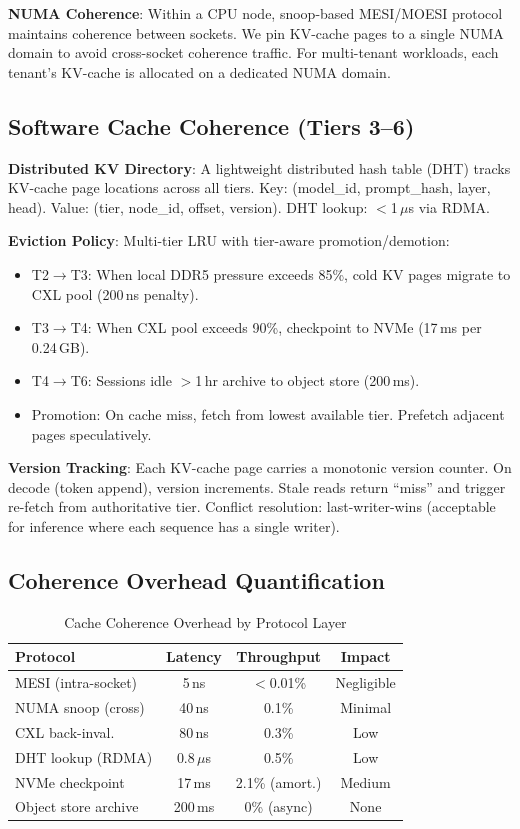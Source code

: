 \documentclass[conference,10pt]{IEEEtran}
\begin{document}
\textbf{NUMA Coherence}: Within a CPU node, snoop-based MESI/MOESI protocol maintains coherence between sockets. We pin KV-cache pages to a single NUMA domain to avoid cross-socket coherence traffic. For multi-tenant workloads, each tenant's KV-cache is allocated on a dedicated NUMA domain.

\subsection{Software Cache Coherence (Tiers 3--6)}

\textbf{Distributed KV Directory}: A lightweight distributed hash table (DHT) tracks KV-cache page locations across all tiers. Key: (model\_id, prompt\_hash, layer, head). Value: (tier, node\_id, offset, version). DHT lookup: $<$1\,$\mu$s via RDMA.

\textbf{Eviction Policy}: Multi-tier LRU with tier-aware promotion/demotion:
\begin{itemize}
\item T2$\to$T3: When local DDR5 pressure exceeds 85\%, cold KV pages migrate to CXL pool (200\,ns penalty).
\item T3$\to$T4: When CXL pool exceeds 90\%, checkpoint to NVMe (17\,ms per 0.24\,GB).
\item T4$\to$T6: Sessions idle $>$1\,hr archive to object store (200\,ms).
\item Promotion: On cache miss, fetch from lowest available tier. Prefetch adjacent pages speculatively.
\end{itemize}

\textbf{Version Tracking}: Each KV-cache page carries a monotonic version counter. On decode (token append), version increments. Stale reads return ``miss'' and trigger re-fetch from authoritative tier. Conflict resolution: last-writer-wins (acceptable for inference where each sequence has a single writer).

\subsection{Coherence Overhead Quantification}

\begin{table}[!htbp]
\caption{Cache Coherence Overhead by Protocol Layer}
\label{tab:coherence}
\centering\footnotesize
\begin{tabular}{@{}lccc@{}}
\toprule
\textbf{Protocol} & \textbf{Latency} & \textbf{Throughput} & \textbf{Impact} \\
\midrule
MESI (intra-socket) & 5\,ns & $<$0.01\% & Negligible \\
NUMA snoop (cross) & 40\,ns & 0.1\% & Minimal \\
CXL back-inval. & 80\,ns & 0.3\% & Low \\
DHT lookup (RDMA) & 0.8\,$\mu$s & 0.5\% & Low \\
NVMe checkpoint & 17\,ms & 2.1\% (amort.) & Medium \\
Object store archive & 200\,ms & 0\% (async) & None \\
\bottomrule
\end{tabular}
\end{table}
\end{document}
